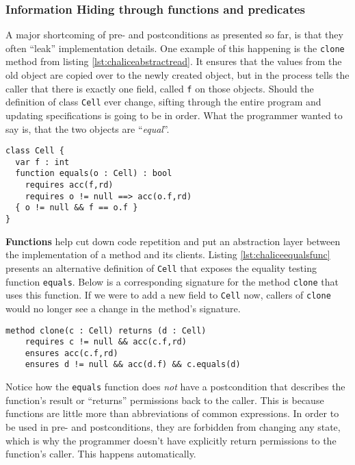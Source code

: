 \subsubsection{Information Hiding through functions and predicates}
A major shortcoming of pre- and postconditions as presented so far, is that they often ``leak'' implementation details. 
One example of this happening is the \lstinline!clone! method from listing \ref{lst:chaliceabstractread}. 
It ensures that the values from the old object are copied over to the newly created object, but in the process tells the caller that there is exactly one field, called \lstinline!f! on those objects. 
Should the definition of class \lstinline!Cell! ever change, sifting through the entire program and updating specifications is going to be in order.
What the programmer wanted to say is, that the two objects are ``\emph{equal}''. 

\begin{lstlisting}[language=Chalice,float,caption={Alternative definition of \lstinline!Cell! using functions.},label={lst:chaliceequalsfunc}]
class Cell {
  var f : int
  function equals(o : Cell) : bool
    requires acc(f,rd)
    requires o != null ==> acc(o.f,rd)
  { o != null && f == o.f }
}
\end{lstlisting}

\textbf{Functions} help cut down code repetition and put an abstraction layer between the implementation of a method and its clients. 
Listing \ref{lst:chaliceequalsfunc} presents an alternative definition of \lstinline!Cell! that exposes the equality testing function \lstinline!equals!. 
Below is a corresponding signature for the method \lstinline!clone! that uses this function. 
If we were to add a new field to \lstinline!Cell! now, callers of \lstinline!clone! would no longer see a change in the method's signature.

\begin{lstlisting}[language=Chalice]
method clone(c : Cell) returns (d : Cell)
    requires c != null && acc(c.f,rd)
    ensures acc(c.f,rd)
    ensures d != null && acc(d.f) && c.equals(d)
\end{lstlisting}

Notice how the \lstinline!equals! function does \emph{not} have a postcondition that describes the function's result or ``returns'' permissions back to the caller. 
This is because functions are little more than abbreviations of common expressions. 
In order to be used in pre- and postconditions, they are forbidden from changing any state, which is why the programmer doesn't have explicitly return permissions to the function's caller. 
This happens automatically.

